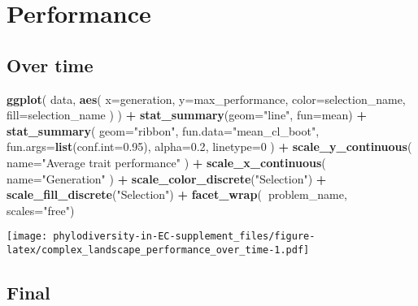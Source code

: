 \documentclass[]{book}
\newenvironment{Shaded}{\begin{snugshade}}{\end{snugshade}}
\newcommand{\DataTypeTok}[1]{\textcolor[rgb]{0.13,0.29,0.53}{#1}}
\newcommand{\DecValTok}[1]{\textcolor[rgb]{0.00,0.00,0.81}{#1}}
\newcommand{\FloatTok}[1]{\textcolor[rgb]{0.00,0.00,0.81}{#1}}
\newcommand{\KeywordTok}[1]{\textcolor[rgb]{0.13,0.29,0.53}{\textbf{#1}}}
\newcommand{\NormalTok}[1]{#1}
\newcommand{\OperatorTok}[1]{\textcolor[rgb]{0.81,0.36,0.00}{\textbf{#1}}}
\newcommand{\StringTok}[1]{\textcolor[rgb]{0.31,0.60,0.02}{#1}}
\begin{document}
\hypertarget{performance-1}{%
\section{Performance}\label{performance-1}}

\hypertarget{over-time-3}{%
\subsection{Over time}\label{over-time-3}}

\begin{Shaded}
\begin{Highlighting}[]
\KeywordTok{ggplot}\NormalTok{(}
\NormalTok{    data,}
    \KeywordTok{aes}\NormalTok{(}
      \DataTypeTok{x=}\NormalTok{generation,}
      \DataTypeTok{y=}\NormalTok{max_performance,}
      \DataTypeTok{color=}\NormalTok{selection_name,}
      \DataTypeTok{fill=}\NormalTok{selection_name}
\NormalTok{    )}
\NormalTok{  ) }\OperatorTok{+}
\StringTok{  }\KeywordTok{stat_summary}\NormalTok{(}\DataTypeTok{geom=}\StringTok{"line"}\NormalTok{, }\DataTypeTok{fun=}\NormalTok{mean) }\OperatorTok{+}
\StringTok{  }\KeywordTok{stat_summary}\NormalTok{(}
    \DataTypeTok{geom=}\StringTok{"ribbon"}\NormalTok{,}
    \DataTypeTok{fun.data=}\StringTok{"mean_cl_boot"}\NormalTok{,}
    \DataTypeTok{fun.args=}\KeywordTok{list}\NormalTok{(}\DataTypeTok{conf.int=}\FloatTok{0.95}\NormalTok{),}
    \DataTypeTok{alpha=}\FloatTok{0.2}\NormalTok{,}
    \DataTypeTok{linetype=}\DecValTok{0}
\NormalTok{  ) }\OperatorTok{+}
\StringTok{  }\KeywordTok{scale_y_continuous}\NormalTok{(}
    \DataTypeTok{name=}\StringTok{"Average trait performance"}
\NormalTok{  ) }\OperatorTok{+}
\StringTok{  }\KeywordTok{scale_x_continuous}\NormalTok{(}
    \DataTypeTok{name=}\StringTok{"Generation"}
\NormalTok{  ) }\OperatorTok{+}
\StringTok{  }\KeywordTok{scale_color_discrete}\NormalTok{(}\StringTok{"Selection"}\NormalTok{) }\OperatorTok{+}\StringTok{ }
\StringTok{  }\KeywordTok{scale_fill_discrete}\NormalTok{(}\StringTok{"Selection"}\NormalTok{) }\OperatorTok{+}
\StringTok{  }\KeywordTok{facet_wrap}\NormalTok{(}\OperatorTok{~}\NormalTok{problem_name, }\DataTypeTok{scales=}\StringTok{"free"}\NormalTok{)}
\end{Highlighting}
\end{Shaded}

\texttt{[image: phylodiversity-in-EC-supplement\_files/figure-latex/complex\_landscape\_performance\_over\_time-1.pdf]}

\hypertarget{final-3}{%
\subsection{Final}\label{final-3}}
\end{document}
